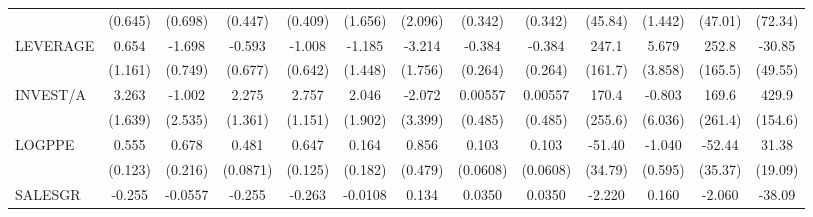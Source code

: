 \begin{table}[htbp]
\begin{tabular}{l*{12}{c}}
                    &     (0.645)         &     (0.698)         &     (0.447)         &     (0.409)         &     (1.656)         &     (2.096)         &     (0.342)         &     (0.342)         &     (45.84)         &     (1.442)         &     (47.01)         &     (72.34)         \\
LEVERAGE            &       0.654         &      -1.698\sym{**} &      -0.593         &      -1.008         &      -1.185         &      -3.214\sym{*}  &      -0.384         &      -0.384         &       247.1         &       5.679         &       252.8         &      -30.85         \\
                    &     (1.161)         &     (0.749)         &     (0.677)         &     (0.642)         &     (1.448)         &     (1.756)         &     (0.264)         &     (0.264)         &     (161.7)         &     (3.858)         &     (165.5)         &     (49.55)         \\
INVEST/A            &       3.263\sym{*}  &      -1.002         &       2.275         &       2.757\sym{**} &       2.046         &      -2.072         &     0.00557         &     0.00557         &       170.4         &      -0.803         &       169.6         &       429.9\sym{**} \\
                    &     (1.639)         &     (2.535)         &     (1.361)         &     (1.151)         &     (1.902)         &     (3.399)         &     (0.485)         &     (0.485)         &     (255.6)         &     (6.036)         &     (261.4)         &     (154.6)         \\
LOGPPE              &       0.555\sym{***}&       0.678\sym{***}&       0.481\sym{***}&       0.647\sym{***}&       0.164         &       0.856         &       0.103         &       0.103         &      -51.40         &      -1.040         &      -52.44         &       31.38         \\
                    &     (0.123)         &     (0.216)         &    (0.0871)         &     (0.125)         &     (0.182)         &     (0.479)         &    (0.0608)         &    (0.0608)         &     (34.79)         &     (0.595)         &     (35.37)         &     (19.09)         \\
SALESGR             &      -0.255         &     -0.0557         &      -0.255         &      -0.263\sym{*}  &     -0.0108         &       0.134         &      0.0350         &      0.0350         &      -2.220         &       0.160         &      -2.060         &      -38.09         \\

\end{tabular}
\end{table}
